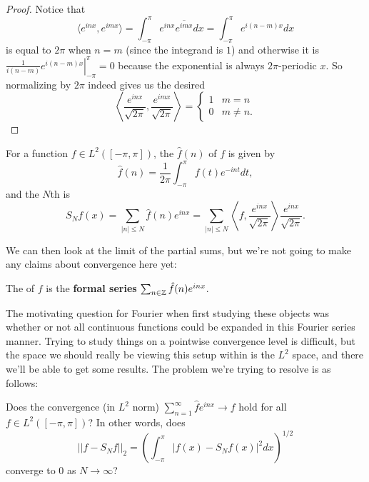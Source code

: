 \begin{proof}
Notice that 
\[
    \langle e^{inx}, e^{imx} \rangle = \int_{-\pi}^{\pi} e^{inx} \overline{e^{imx}} dx = \int_{-\pi}^{\pi} e^{i(n-m)x} dx 
\]
is equal to $2\pi$ when $ n = m$ (since the integrand is $1$) and otherwise it is
$\left.\frac{1}{i(n-m)} e^{i(n-m)x}\right|^\pi_{-\pi} = 0$ because the exponential is always $2\pi$-periodic $x$. So normalizing by $2\pi$ indeed gives us the desired 
\[
    \left\langle \frac{e^{inx}}{\sqrt{2\pi}}, \frac{e^{imx}}{\sqrt{2\pi}}\right\rangle = \begin{cases} 1 & m = n \\ 0 & m \ne n. \end{cases}
\]
\end{proof}

\begin{definition}
For a function $f \in L^2([-\pi, \pi])$, the  $\hat{f}(n)$ of $f$ is given by 
\[
    \hat{f}(n) = \frac{1}{2\pi} \int_{-\pi}^{\pi} f(t) e^{-int} dt,
\]
and the $N$th  is 
\[
    S_N f(x) = \sum_{|n| \le N} \hat{f}(n) e^{inx} = \sum_{|n| \le N} \left\langle f, \frac{e^{inx}}{\sqrt{2\pi}} \right\rangle \frac{e^{inx}}{\sqrt{2\pi}}.
\]
\end{definition}

We can then look at the limit of the partial sums, but we're not going to make any claims about convergence here yet:

\begin{definition}
The  of $f$ is the \textbf{formal series} $\sum_{n \in \mathbb Z} \hat{f}(n) e^{inx}$.
\end{definition}

The motivating question for Fourier when first studying these objects was whether or not all continuous functions could be expanded in this Fourier series manner. Trying to study things on a pointwise convergence level is difficult, but the space we should really be viewing this setup within is the $L^2$ space, and there we'll be able to get some results. The problem we're trying to resolve is as follows: 

\begin{problem}
Does the convergence (in $L^2$ norm) $\sum_{n=1}^{\infty} \hat{f} e^{inx} \to f$ hold for all $f \in L^2([-\pi, \pi])$? In other words, does 
\[
    ||f - S_N f||_2 = \left(\int_{-\pi}^{\pi} |f(x) - S_Nf(x)|^2 dx \right)^{1/2}
\]
converge to $0$ as $N \to \infty$?
\end{problem}

